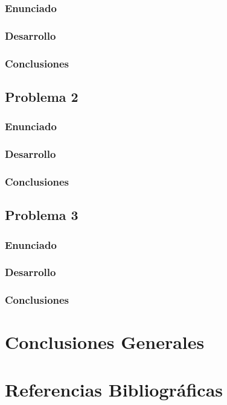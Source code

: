 \documentclass[a4paper,12pt]{article}
\theoremstyle{mytheor}
\begin{document}
\subsubsection{Enunciado}

\subsubsection{Desarrollo}

\subsubsection{Conclusiones}

\subsection{Problema 2}
\subsubsection{Enunciado}

\subsubsection{Desarrollo}

\subsubsection{Conclusiones}

\subsection{Problema 3}
\subsubsection{Enunciado}

\subsubsection{Desarrollo}

\subsubsection{Conclusiones}

\newpage

\section{Conclusiones Generales}

\section{Referencias Bibliográficas}
\end{document}
